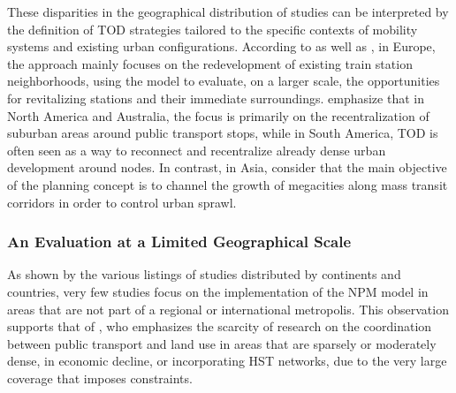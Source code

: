 \begin{refsegment}
These disparities in the geographical distribution of studies can be interpreted by the definition of \acrshort{TOD} strategies tailored to the specific contexts of mobility systems and existing urban configurations. According to \textcolor{blue}{\textcite[]{bertolini_cities_2015}} as well as \textcolor{blue}{\textcite[]{ivan_evaluation_2012}}, in Europe, the approach mainly focuses on the redevelopment of existing train station neighborhoods, using the model to evaluate, on a larger scale, the opportunities for revitalizing stations and their immediate surroundings. \textcolor{blue}{\textcite[42]{lyu_developing_2016}} emphasize that in North America and Australia, the focus is primarily on the recentralization of suburban areas around public transport stops, while in South America, \acrshort{TOD} is often seen as a way to reconnect and recentralize already dense urban development around nodes. In contrast, in Asia, \textcolor{blue}{\textcite[42]{lyu_developing_2016}} consider that the main objective of the planning concept is to channel the growth of megacities along mass transit corridors in order to control urban sprawl.%

\subsubsection*{An Evaluation at a Limited Geographical Scale
    \label{chap6:litterature-taille-urbaine}
    }

As shown by the various listings of studies distributed by continents and countries, very few studies focus on the implementation of the \acrshort{NPM} model in areas that are not part of a regional or international metropolis. This observation supports that of \textcolor{blue}{\textcite[111]{nigro_land_2019}}, who emphasizes the scarcity of research on the coordination between public transport and land use in areas that are sparsely or moderately dense, in economic decline, or incorporating \acrfull{HST} networks, due to the very large coverage that imposes constraints.%


\end{refsegment}
